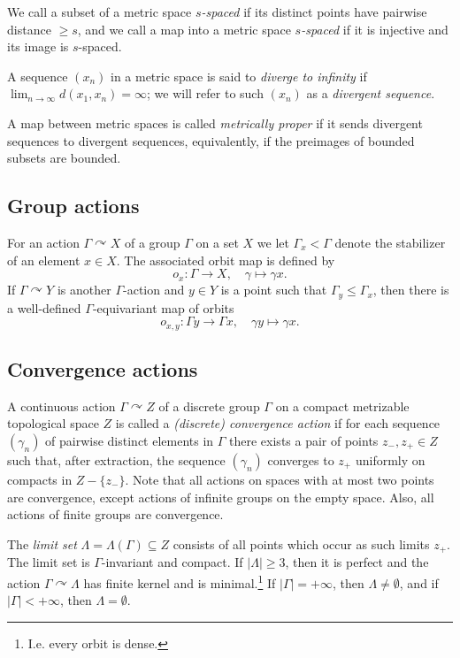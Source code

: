\documentclass[12pt]{article}
\theoremstyle{boldplain}
\theoremstyle{bolddefinition}
\numberwithin{equation}{section}
\def\ga{\gamma}
\def\Ga{\Gamma}
\def\La{\Lambda}
\def\acts{\curvearrowright}
\def\LaGa{\Lambda(\Gamma)}
\begin{document}
We call a subset of a metric space {\em $s$-spaced} if its distinct points have pairwise distance $\geq s$,
and we call a map into a metric space {\em $s$-spaced} if it is injective and its image is $s$-spaced.

A sequence $(x_n)$ in a metric space is said to {\em diverge to infinity} if $\lim_{n\to\infty} d(x_1, x_n)= \infty$; 
we will refer to such $(x_n)$ as a {\em divergent sequence}.  

A map between metric spaces is called {\em metrically proper} if it sends divergent sequences to divergent sequences,
equivalently, if the preimages of bounded subsets are bounded.

\subsection{Group actions}

For an action $\Ga\acts X$ of a group $\Ga$ on a set $X$ 
we let $\Ga_x<\Ga$ denote the stabilizer of an element $x\in X$.
The associated orbit map is defined by 
$$ o_x: \Ga\to X, \quad \ga\mapsto\ga x. $$
If $\Ga\acts Y$ is another $\Ga$-action and $y\in Y$ is a point such that $\Ga_y\leq\Ga_x$,
then there is a well-defined $\Ga$-equivariant map of orbits
$$ o_{x,y}: \Ga y \to \Ga x , \quad \ga y \mapsto \ga x .$$



\subsection{Convergence actions}
\label{sec:conv}

A continuous action $\Ga\acts Z$ 
of a discrete group $\Ga$ 
on a compact metrizable topological space $Z$ 
is called a {\em (discrete) convergence action} 
if for each sequence $(\ga_n)$ of pairwise distinct elements in $\Ga$ 
there exists a pair of  points $z_-, z_+\in Z$ such that, after extraction, 
the sequence $(\ga_n)$ converges to $z_+$ uniformly on compacts in $Z- \{z_-\}$. 
Note that all actions on spaces with at most two points are convergence,
except actions of infinite groups on the empty space.
Also, all actions of finite groups are convergence. 

The {\em limit set} $\La=\LaGa\subseteq Z$ consists of all points which occur as such limits $z_+$.
The limit set is $\Ga$-invariant and compact.
If $|\La|\geq3$, then it is perfect and the action $\Ga\acts\La$ has finite kernel and is minimal.\footnote{I.e. every orbit is dense.}
If $|\Ga|=+\infty$, then $\La\neq\emptyset$,
and if $|\Ga|<+\infty$, then $\La=\emptyset$.
\end{document}
